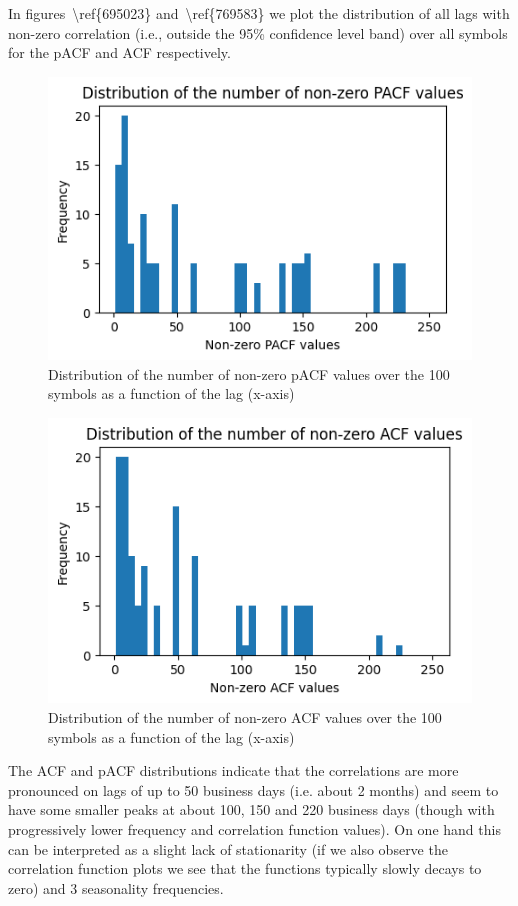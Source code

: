\documentclass[10pt]{article}
\begin{document}
In figures~{\textbackslash ref\{695023\}}
and~{\textbackslash ref\{769583\}} we plot the distribution of all lags
with non-zero correlation (i.e., outside the 95\% confidence level band)
over all symbols for the pACF and ACF respectively.
\begin{figure}[H]
\begin{center}
\includegraphics[width=0.70\columnwidth]{figures/output7/output7}
\caption{{Distribution of the number of non-zero pACF values over the 100 symbols
as a function of the lag (x-axis)
{\label{695023}}%
}}
\end{center}
\end{figure}
\begin{figure}[H]
\begin{center}
\includegraphics[width=0.70\columnwidth]{figures/output8/output8}
\caption{{Distribution of the number of non-zero ACF values over the 100 symbols
as a function of the lag (x-axis)
{\label{769583}}%
}}
\end{center}
\end{figure}

The ACF and pACF distributions indicate that the correlations are more
pronounced on lags of up to 50 business days (i.e. about 2 months) and
seem to have some smaller peaks at about 100, 150 and 220 business days
(though with progressively lower frequency and correlation function
values). On one hand this can be interpreted as a slight lack of
stationarity (if we also observe the correlation function plots we see
that the functions typically slowly decays to zero) and 3 seasonality
frequencies.
\end{document}
